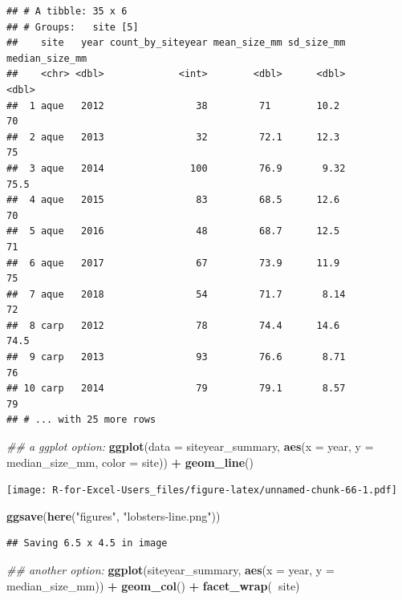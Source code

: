 \documentclass[]{book}
\newenvironment{Shaded}{\begin{snugshade}}{\end{snugshade}}
\newcommand{\CommentTok}[1]{\textcolor[rgb]{0.56,0.35,0.01}{\textit{#1}}}
\newcommand{\DataTypeTok}[1]{\textcolor[rgb]{0.13,0.29,0.53}{#1}}
\newcommand{\KeywordTok}[1]{\textcolor[rgb]{0.13,0.29,0.53}{\textbf{#1}}}
\newcommand{\NormalTok}[1]{#1}
\newcommand{\OperatorTok}[1]{\textcolor[rgb]{0.81,0.36,0.00}{\textbf{#1}}}
\newcommand{\StringTok}[1]{\textcolor[rgb]{0.31,0.60,0.02}{#1}}
\begin{document}
\begin{verbatim}
## # A tibble: 35 x 6
## # Groups:   site [5]
##    site   year count_by_siteyear mean_size_mm sd_size_mm median_size_mm
##    <chr> <dbl>             <int>        <dbl>      <dbl>          <dbl>
##  1 aque   2012                38         71        10.2            70  
##  2 aque   2013                32         72.1      12.3            75  
##  3 aque   2014               100         76.9       9.32           75.5
##  4 aque   2015                83         68.5      12.6            70  
##  5 aque   2016                48         68.7      12.5            71  
##  6 aque   2017                67         73.9      11.9            75  
##  7 aque   2018                54         71.7       8.14           72  
##  8 carp   2012                78         74.4      14.6            74.5
##  9 carp   2013                93         76.6       8.71           76  
## 10 carp   2014                79         79.1       8.57           79  
## # ... with 25 more rows
\end{verbatim}

\begin{Shaded}
\begin{Highlighting}[]
\CommentTok{## a ggplot option:}
\KeywordTok{ggplot}\NormalTok{(}\DataTypeTok{data =}\NormalTok{ siteyear_summary, }\KeywordTok{aes}\NormalTok{(}\DataTypeTok{x =}\NormalTok{ year, }\DataTypeTok{y =}\NormalTok{ median_size_mm, }\DataTypeTok{color =}\NormalTok{ site)) }\OperatorTok{+}
\StringTok{  }\KeywordTok{geom_line}\NormalTok{() }
\end{Highlighting}
\end{Shaded}

\texttt{[image: R-for-Excel-Users\_files/figure-latex/unnamed-chunk-66-1.pdf]}

\begin{Shaded}
\begin{Highlighting}[]
\KeywordTok{ggsave}\NormalTok{(}\KeywordTok{here}\NormalTok{(}\StringTok{"figures"}\NormalTok{, }\StringTok{"lobsters-line.png"}\NormalTok{))}
\end{Highlighting}
\end{Shaded}

\begin{verbatim}
## Saving 6.5 x 4.5 in image
\end{verbatim}

\begin{Shaded}
\begin{Highlighting}[]
\CommentTok{## another option:}
\KeywordTok{ggplot}\NormalTok{(siteyear_summary, }\KeywordTok{aes}\NormalTok{(}\DataTypeTok{x =}\NormalTok{ year, }\DataTypeTok{y =}\NormalTok{ median_size_mm)) }\OperatorTok{+}
\StringTok{  }\KeywordTok{geom_col}\NormalTok{() }\OperatorTok{+}
\StringTok{  }\KeywordTok{facet_wrap}\NormalTok{(}\OperatorTok{~}\NormalTok{site)}
\end{Highlighting}
\end{Shaded}
\end{document}
